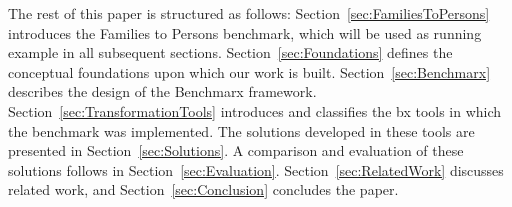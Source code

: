 The rest of this paper is structured as follows: Section~\ref{sec:FamiliesToPersons} introduces the Families to Persons benchmark, which will be used as running example in all subsequent sections. Section~\ref{sec:Foundations} defines the conceptual foundations upon which our work is built. Section~\ref{sec:Benchmarx} describes the design of the Benchmarx framework. Section~\ref{sec:TransformationTools} introduces and classifies the bx tools in which the benchmark was implemented. The solutions developed in these tools are presented in Section~\ref{sec:Solutions}. A comparison and evaluation of these solutions follows in Section~\ref{sec:Evaluation}. Section~\ref{sec:RelatedWork} discusses related work, and Section~\ref{sec:Conclusion} concludes the paper.